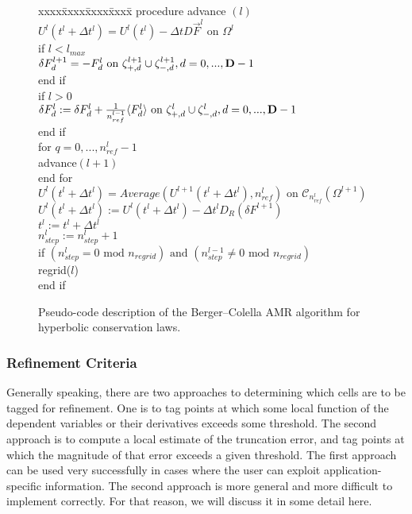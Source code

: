 \begin{figure}[thp]
\hrulefill
\begin{tabbing} 
xxxx\=xxxx\=xxxx\=xxxx\=\kill
\>procedure advance $(l)$ \\
\>$U^l(t^l + \Delta t^l) = U^l(t^l) - \Delta t D \vec{F}^l \mbox{ on }
\Omega^l$ \\
\>if $l<l_{max}$ \\
\>\>$\delta F^{l+1}_d = -F^l_d \mbox{ on }
{\zeta}^{l+1}_{+,d} \cup {\zeta}^{l+1}_{-,d} , d=0, ..., {\mathbf{D}}-1$ \\
\> end if \\
\>if $l>0$ \\
\>\> $\delta F^l_d :=  \delta F^l_d + \frac{1}{n^{l-1}_{ref}} \langle F^l_d \rangle \mbox{ on }
{\zeta}^l_{+,d} \cup {\zeta}^l_{-,d} , d=0, ..., {\mathbf{D}}-1$  \\
\> end if \\
\>for $q = 0, ..., n^l_{ref} -1$ \\
\>\> advance$(l+1)$ \\
\> end for \\
\>$U^l(t^l + \Delta t^l) = Average(U^{l+1}(t^l + \Delta t^l), n^l_{ref})
\mbox{ on } {\mathcal{C}}_{n^l_{ref}} (\Omega^{l+1})$ \\
\>$U^l(t^l + \Delta t^l) := U^l(t^l + \Delta t^l) - \Delta t^l D_R
(\delta F^{l+1})$ \\
\>$t^l := t^l + \Delta t^l$ \\
\>$n^l_{step} := n^l_{step}+ 1$ \\
\>if $(n^l_{step} = 0 \mbox{ mod } n_{regrid}) \mbox{ and } (n^{l-1}_{step} \neq 0 \mbox{ mod } n_{regrid}) $\\
\>\>regrid($l$) \\
\> end if
\end{tabbing}
\hrulefill
\caption{Pseudo-code description of the Berger--Colella AMR algorithm for 
hyperbolic conservation laws.}
\label{fig:HSCLcode}
\end{figure}

\subsubsection*{Refinement Criteria}

Generally speaking, there are two approaches to determining which
cells are to be tagged for refinement.  One is to tag points at which
some local function of the dependent variables or their derivatives
exceeds some threshold.  The second approach is to compute a local
estimate of the truncation error, and tag points at which the
magnitude of that error exceeds a given threshold.  The first approach
can be used very successfully in cases where the user can exploit
application-specific information.  The second approach is more
general and more difficult to implement correctly.  For that reason,
we will discuss it in some detail here.

